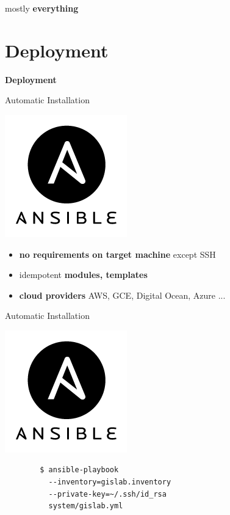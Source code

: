 \documentclass[12pt]{beamer}
\begin{document}
\begin{frame}
	\begin{center}
		mostly \textbf{everything}
	\end{center}
\end{frame}


\section{Deployment}
\begin{frame}
	\begin{center}
		\LARGE\textbf{Deployment}	
	\end{center}
\end{frame}

\begin{frame}{Automatic Installation}
	\begin{center}
		\includegraphics[keepaspectratio=true,height=0.4\textheight]{images/ansible.png}
	\end{center}
	\begin{itemize}
		\item \textbf{no requirements on target machine} except SSH
		\item idempotent \textbf{modules, templates}
		\item \textbf{cloud providers} AWS, GCE, Digital Ocean, Azure ...
	\end{itemize}
\end{frame}

\begin{frame}[fragile]{Automatic Installation}
	\begin{center}
		\includegraphics[keepaspectratio=true,height=0.4\textheight]{images/ansible.png}
	\end{center}

   \lstset{language=sh}
	\begin{lstlisting}
		$ ansible-playbook
		  --inventory=gislab.inventory
		  --private-key=~/.ssh/id_rsa
		  system/gislab.yml
	\end{lstlisting}
\end{frame}
\end{document}
